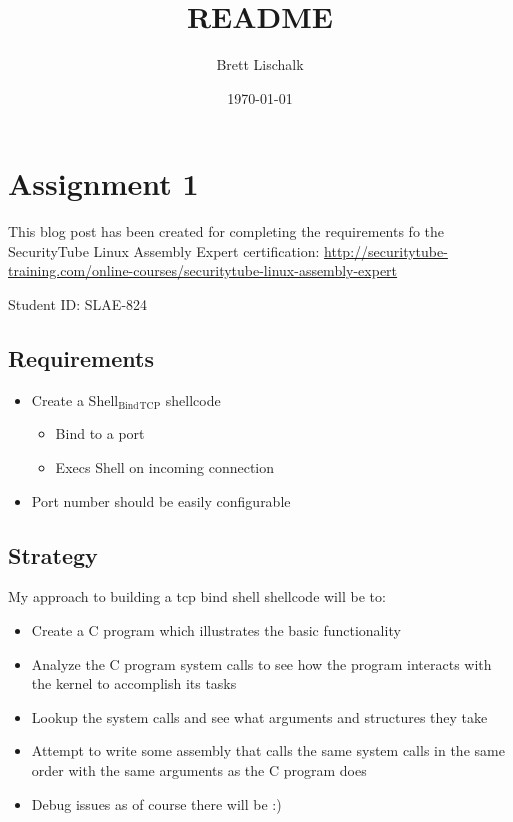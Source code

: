 \documentclass[11pt]{article}
\author{Brett Lischalk}
\date{\today}
\title{README}
\begin{document}
\maketitle
\tableofcontents

\section{Assignment 1}
\label{sec-1}

This blog post has been created for completing the requirements fo the SecurityTube
Linux Assembly Expert certification:
\href{http://securitytube-training.com/online-courses/securitytube-linux-assembly-expert}{\url{http://securitytube-training.com/online-courses/securitytube-linux-assembly-expert}}

Student ID: SLAE-824

\subsection{Requirements}
\label{sec-1-1}

\begin{itemize}
\item Create a Shell$_{\text{Bind}}$$_{\text{TCP}}$ shellcode
\begin{itemize}
\item Bind to a port
\item Execs Shell on incoming connection
\end{itemize}
\item Port number should be easily configurable
\end{itemize}

\subsection{Strategy}
\label{sec-1-2}

My approach to building a tcp bind shell shellcode will be to:

\begin{itemize}
\item Create a C program which illustrates the basic functionality
\item Analyze the C program system calls to see how the program interacts with the kernel to accomplish its tasks
\item Lookup the system calls and see what arguments and structures they take
\item Attempt to write some assembly that calls the same system calls in the same order with the same arguments as the C program does
\item Debug issues as of course there will be :)
\end{itemize}
\end{document}
